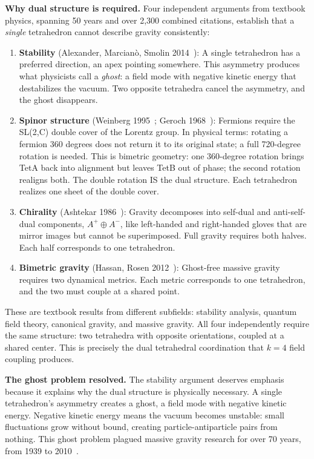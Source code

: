 \documentclass[aps,prd,preprint,superscriptaddress,showpacs,preprintnumbers,amsmath,amssymb,nofootinbib]{revtex4-2}
\begin{document}
\textbf{Why dual structure is required.} Four independent arguments from textbook physics, spanning 50 years and over 2,300 combined citations, establish that a \emph{single} tetrahedron cannot describe gravity consistently:

\begin{enumerate}
\item \textbf{Stability} (Alexander, Marcian\`o, Smolin 2014~\cite{alexander2014}): A single tetrahedron has a preferred direction, an apex pointing somewhere. This asymmetry produces what physicists call a \emph{ghost}: a field mode with negative kinetic energy that destabilizes the vacuum. Two opposite tetrahedra cancel the asymmetry, and the ghost disappears.

\item \textbf{Spinor structure} (Weinberg 1995~\cite{weinberg1995}; Geroch 1968~\cite{geroch1968}): Fermions require the SL(2,C) double cover of the Lorentz group. In physical terms: rotating a fermion 360 degrees does not return it to its original state; a full 720-degree rotation is needed. This is bimetric geometry: one 360-degree rotation brings TetA back into alignment but leaves TetB out of phase; the second rotation realigns both. The double rotation IS the dual structure. Each tetrahedron realizes one sheet of the double cover.

\item \textbf{Chirality} (Ashtekar 1986~\cite{ashtekar1986}): Gravity decomposes into self-dual and anti-self-dual components, $A^+ \oplus A^-$, like left-handed and right-handed gloves that are mirror images but cannot be superimposed. Full gravity requires both halves. Each half corresponds to one tetrahedron.

\item \textbf{Bimetric gravity} (Hassan, Rosen 2012~\cite{hassan2012}): Ghost-free massive gravity requires two dynamical metrics. Each metric corresponds to one tetrahedron, and the two must couple at a shared point.
\end{enumerate}

These are textbook results from different subfields: stability analysis, quantum field theory, canonical gravity, and massive gravity. All four independently require the same structure: two tetrahedra with opposite orientations, coupled at a shared center. This is precisely the dual tetrahedral coordination that $k = 4$ field coupling produces.

\textbf{The ghost problem resolved.} The stability argument deserves emphasis because it explains why the dual structure is physically necessary. A single tetrahedron's asymmetry creates a ghost, a field mode with negative kinetic energy. Negative kinetic energy means the vacuum becomes unstable: small fluctuations grow without bound, creating particle-antiparticle pairs from nothing. This ghost problem plagued massive gravity research for over 70 years, from 1939 to 2010~\cite{boulware1972}.
\end{document}
